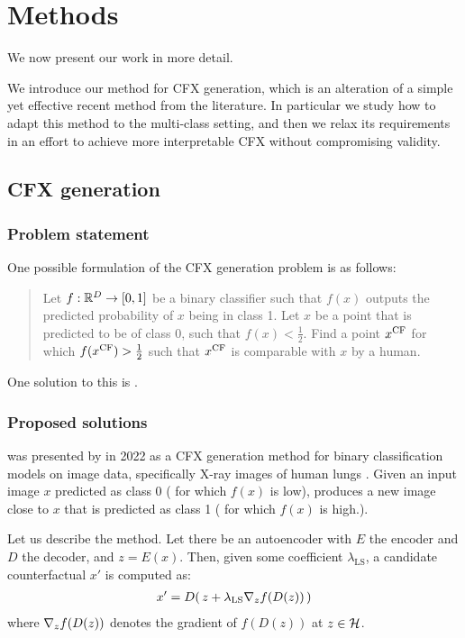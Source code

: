 \documentclass[../main.tex]{subfiles}
\begin{document}
\chapter{Methods}
\label{ch:methods}

We now present our work in more detail.

We introduce our method for CFX generation, which is an alteration of a simple yet effective recent method from the literature.
In particular we study how to adapt this method to the multi-class setting, and then
we relax its requirements in an effort to achieve more interpretable CFX without compromising validity.

\section{CFX generation}

\subsection{Problem statement}

One possible formulation of the CFX generation problem is as follows:
\begin{quote}
Let $f: \R^\inputdim \to [0, 1]$ be a binary classifier such that $f(x)$ outputs the predicted probability of $x$ being in class 1.
Let $x$ be a point that is predicted to be of class 0, \ie{} such that $f(x) < \frac{1}{2}$.
Find a point $\CF{x}$ for which $f(\CF{x}) > \frac{1}{2}$ such that $\CF{x}$ is comparable with $x$ by a human.
\end{quote}

One solution to this is \ls{}.

\subsection{Proposed solutions}
\label{methods:0_sols}

\ls{} was presented by \citeauthor{cohenGifsplanation2022} in 2022 as a CFX generation method for binary classification models on image data, specifically X-ray images of human lungs \cite{cohenGifsplanation2022}.
Given an input image $x$ predicted as class 0 (\ie{} for which $f(x)$ is low), \ls{} produces a new image close to $x$ that is predicted as class 1 (\ie{} for which $f(x)$ is high.).

Let us describe the method.
Let there be an autoencoder with $E$ the encoder and $D$ the decoder, and $z = E(x)$.
Then, given some coefficient $\lambda_\text{LS}$, a candidate counterfactual $x'$ is computed as:
\begin{align*}
    x' = D (\, z + \lambda_\text{LS} \grad{f(D(z))}{z} \,)
\end{align*} 
where $\grad{f(D(z))}{z}$ denotes the gradient of $f(D(z))$ at $z \in \latentspace$.
\end{document}
